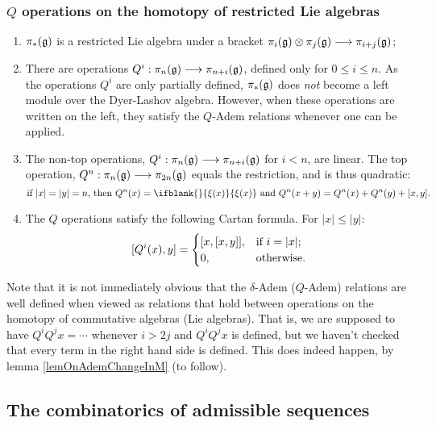 \documentclass[10pt]{article}
\newcommand{\restn}[2][]{\ifblank{#1}{\xi{#2}}{\xi_{#1}{#2}}}%
\renewcommand{\Q}{Q}
\begin{document}
\begin{SteenrodAlgebrasAndTheirKoszulDuals}
\subsubsection{$\Q$ operations on the homotopy of restricted Lie algebras}
\begin{enumerate}\squishlist
\setlength{\parindent}{.25in}
\item $\pi_*(\mathfrak{g})$ is a restricted Lie algebra under a bracket $\pi_i(\mathfrak{g})\otimes \pi_j(\mathfrak{g})\longrightarrow \pi_{i+j}(\mathfrak{g})$;
\item There are operations $\Q^i:\pi_n(\frakg)\to \pi_{n+i}(\frakg)$, defined only for $0\leq i\leq n$. As the operations $\Q^i$ are only partially defined, $\pi_*(\mathfrak{g})$ does \emph{not} become a left module over the Dyer-Lashov algebra. However, when these operations are written on the left, they satisfy the $\Q$-Adem relations whenever one can be applied.
\item The non-top operations, $\Q^i:\pi_n(\frakg)\to \pi_{n+i}(\frakg)$ for $i<n$, are linear. The top operation, $\Q^n:\pi_n(\frakg)\to \pi_{2n}(\frakg)$ equals the restriction, and is thus quadratic:
\[\textup{if $|x|=|y|=n$, then }\Q^n(x)=\restn{(x)}\textup{ and }\Q^n(x+y)=\Q^n(x)+\Q^n(y)+[x,y].\]
\item The $\Q$ operations satisfy the following Cartan formula. For $|x|\leq |y|$:
\[[\Q^i(x),y]=\begin{cases}
[x,[x,y]],&\textup{if }i=|x|;\\
0,&\textup{otherwise}.
\end{cases}
\]
\end{enumerate}

Note that it is not immediately obvious that the $\delta$-Adem ($\Q$-Adem) relations are well defined when viewed as relations that hold between operations on the homotopy of commutative algebras (Lie algebras). That is, we are supposed to have $\Q^i\Q^jx=\cdots $ whenever $i>2j$ and $\Q^i\Q^jx$ is defined, but we haven't checked that every term in the right hand side is defined. This does indeed happen, by lemma \ref{lemOnAdemChangeInM} (to follow). 

\subsection{The combinatorics of admissible sequences}


\end{SteenrodAlgebrasAndTheirKoszulDuals}
\end{document}
